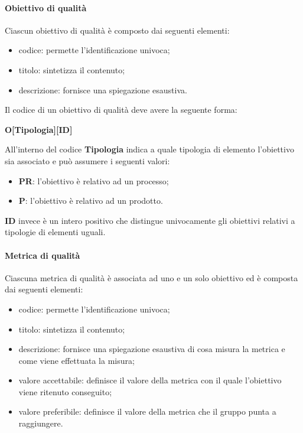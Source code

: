 \paragraph{Obiettivo di qualità}
\label{par:obiettivo_qualita}

Ciascun obiettivo di qualità è composto dai seguenti elementi:
\begin{itemize}
	\item codice: permette l'identificazione univoca;
	\item titolo: sintetizza il contenuto;
	\item descrizione: fornisce una spiegazione esaustiva.
\end{itemize}

Il codice di un obiettivo di qualità deve avere la seguente forma:
\begin{center}
	\textbf{O[Tipologia][ID]}
\end{center}
All'interno del codice \textbf{Tipologia} indica a quale tipologia di elemento l'obiettivo sia associato e può assumere i seguenti valori:
\begin{itemize}
	\item \textbf{PR}: l'obiettivo è relativo ad un processo;
	\item \textbf{P}: l'obiettivo è relativo ad un prodotto.
\end{itemize}
\textbf{ID} invece è un intero positivo che distingue univocamente gli obiettivi relativi a tipologie di elementi uguali.

\paragraph{Metrica di qualità}
\label{par:metrica_qualita}

Ciascuna metrica di qualità è associata ad uno e un solo obiettivo ed è composta dai seguenti elementi:
\begin{itemize}
	\item codice: permette l'identificazione univoca;
	\item titolo: sintetizza il contenuto;
	\item descrizione: fornisce una spiegazione esaustiva di cosa misura la metrica e come viene effettuata la misura;
	\item valore accettabile: definisce il valore della metrica con il quale l'obiettivo viene ritenuto conseguito;
	\item valore preferibile: definisce il valore della metrica che il gruppo punta a raggiungere.
\end{itemize}

